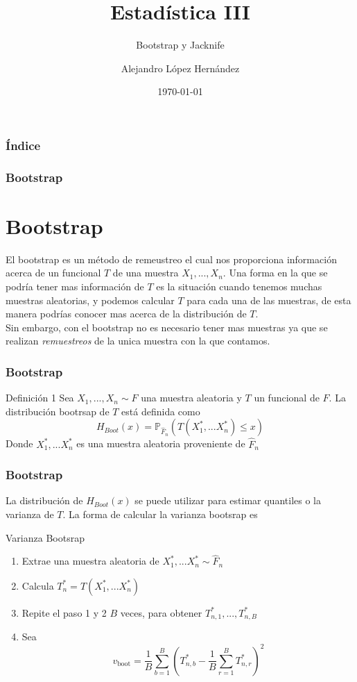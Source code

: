 \documentclass[aspectratio=169,spanish]{beamer}
\title{Estadística III}
\subtitle{Bootstrap y Jacknife}
\author{Alejandro López Hernández}
\institute{FES Acatlán - UNAM}
\date{\today}
\begin{document}
\frame{\titlepage}



\begin{frame}
\frametitle{Índice}
\tableofcontents
\end{frame}

\begin{frame}
\frametitle{Bootstrap}
\section{Bootstrap}
El bootstrap es un método de remeustreo el cual nos proporciona información acerca de un funcional $T$ de una muestra $X_1,...,X_n$. Una forma en la que se podría tener mas información de $T$ es la situación cuando tenemos muchas muestras aleatorias, y podemos calcular $T$ para cada una de las muestras, de esta manera podrías conocer mas acerca de la distribución de $T$.
\\
Sin embargo, con el bootstrap no es necesario tener mas muestras ya que se realizan \textit{remuestreos} de la unica muestra con la que contamos. 
\end{frame}


\begin{frame}
\frametitle{Bootstrap}
\begin{block}{Definición 1}
Sea $X_1,...,X_n\sim F$ una muestra aleatoria y $T$ un funcional de $F$. La distribución bootrsap de $T$ está definida como 
$$H_{{Boot}}(x) = \mathbb{P}_{\hat{F}_n}(T(X_1^{*},...X_n^{*})\le x)$$
Donde $X_1^{*},...X_n^{*}$ es una muestra aleatoria proveniente de $\hat{F}_n$
\end{block}
\end{frame}

\begin{frame}
\frametitle{Bootstrap}
La distribución de $H_{{Boot}}(x)$ se puede utilizar para estimar quantiles o la varianza de $T$. La forma de calcular la varianza bootsrap es
\begin{block}{Varianza Bootsrap}
\begin{enumerate}
\item Extrae una muestra aleatoria de $X_1^{*},...X_n^{*}\sim\hat{F}_n$
\item Calcula $T_n^{*} = T(X_1^{*},...X_n^{*})$
\item Repite el paso 1 y 2 $B$ veces, para obtener $T_{n,1}^{*},...,T_{n,B}^{*}$
\item Sea $$v_{\text{boot}}=\frac{1}{B}\sum_{b=1}^{B}\left(T_{n,b}^{*}-\frac{1}{B}\sum_{r=1}^{B}T_{n,r}^{*}\right)^2$$
\end{enumerate}
\end{block}
\end{frame}
\end{document}
